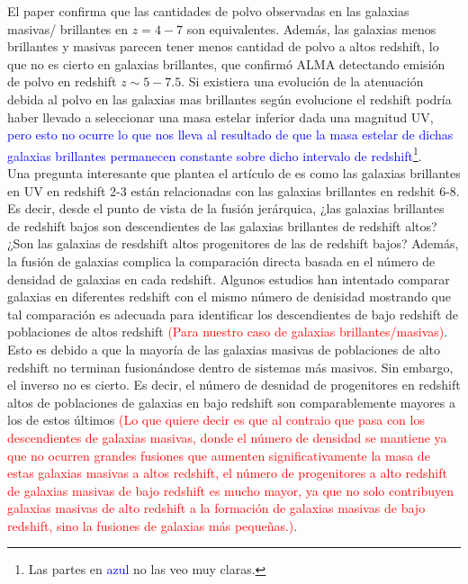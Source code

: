 \documentclass{article}
\begin{document}
El paper \cite{finkelstein2015increasing} confirma que las cantidades de polvo observadas en las galaxias masivas/ brillantes en $z=4-7$ son equivalentes. Además, las galaxias menos brillantes y masivas parecen tener menos cantidad de polvo a altos redshift, lo que no es cierto en galaxias brillantes, que confirmó ALMA detectando emisión de polvo en redshift $z\sim 5-7.5$. Si existiera una evolución de la atenuación debida al polvo en las galaxias mas brillantes según evolucione el redshift  podría haber llevado a seleccionar una masa estelar inferior dada una magnitud UV, \textcolor{blue}{pero esto no ocurre lo que nos lleva al resultado de que la masa estelar de dichas galaxias brillantes permanecen constante sobre dicho intervalo de redshift}\footnote{Las partes en  \textcolor{blue}{azul} no las veo muy claras.}. \\

Una pregunta interesante que plantea el artículo de \cite{finkelstein2015increasing} es como las galaxias brillantes en UV en redshift 2-3 están relacionadas con las galaxias brillantes en redshit 6-8. Es decir, desde el punto de vista de la fusión jerárquica, ¿las galaxias brillantes de redshift bajos son descendientes de las galaxias brillantes de redshift altos? ¿Son las galaxias de resdshift altos progenitores de las de redshift bajos? Además, la fusión de galaxias complica la comparación directa basada en el número de densidad de galaxias en cada redshift. Algunos estudios han intentado comparar galaxias en diferentes redshift con el mismo número de denisidad mostrando que tal comparación es adecuada para identificar los descendientes de bajo redshift de poblaciones de altos redshift \textcolor{red}{(Para nuestro caso de galaxias brillantes/masivas)}. Esto es debido a que la mayoría de las galaxias masivas de poblaciones de alto redshift no terminan fusionándose dentro de sistemas más masivos. Sin embargo, el inverso no es cierto. Es decir, el número de desnidad de progenitores en redshift altos de poblaciones de galaxias en bajo redshift son comparablemente mayores a los de estos últimos \textcolor{red}{(Lo que quiere decir es que al contraio que pasa con los descendientes de galaxias masivas, donde el número de densidad se mantiene ya que no ocurren grandes fusiones que aumenten significativamente la masa de estas galaxias masivas a altos redshift, el número de progenitores a alto redshift de galaxias masivas de bajo redshift es mucho mayor, ya que no solo contribuyen galaxias masivas de alto redshift a la formación de galaxias masivas de bajo redshift, sino la fusiones de galaxias más pequeñas.)}.\\
\end{document}
